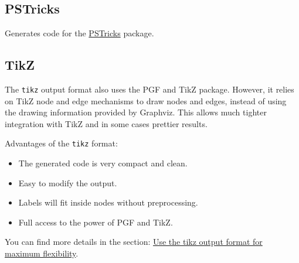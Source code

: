 \documentclass[10pt,a4paper,english]{article}
\newlength{\admonitionwidth}
\begin{document}

\hypertarget{id2}{}
\subsection*{PSTricks}
\label{id2}

Generates code for the \href{http://tug.org/PSTricks/main.cgi/}{PSTricks} package.



\hypertarget{tikz}{}
\subsection*{TikZ}
\label{tikz}

The \texttt{tikz} output format also uses the PGF and TikZ package. However, it relies on TikZ node and edge mechanisms to draw nodes and edges, instead of using the drawing information provided by Graphviz. This allows much tighter integration with TikZ and in some cases prettier results.

Advantages of the \texttt{tikz} format:
\begin{itemize}
\item {} 
The generated code is very compact and clean.

\item {} 
Easy to modify the output.

\item {} 
Labels will fit inside nodes without preprocessing.

\item {} 
Full access to the power of PGF and TikZ.

\end{itemize}

You can find more details in the section: \href{\#use-the-tikz-output-format-for-maximum-flexibility}{Use the tikz output format for maximum flexibility}.
\begin{center}\begin{sffamily}
\end{sffamily}
\end{center}
\end{document}
